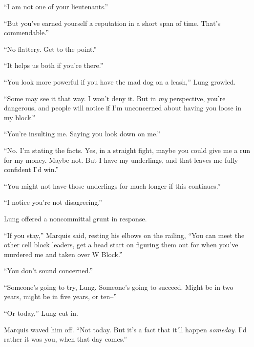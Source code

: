 ``I am not one of your lieutenants.''



``But you've earned yourself a reputation in a short span of time.  That's commendable.''



``No flattery.  Get to the point.''



``It helps us both if you're there.''



``You look more powerful if you have the mad dog on a leash,'' Lung growled.



``Some may see it that way.  I won't deny it.  But in \emph{my} perspective, you're dangerous, and people will notice if I'm unconcerned about having you loose in my block.''



``You're insulting me.  Saying you look down on me.''



``No.  I'm stating the facts.  Yes, in a straight fight, maybe you could give me a run for my money.  Maybe not.  But I have my underlings, and that leaves me fully confident I'd win.''



``You might not have those underlings for much longer if this continues.''



``I notice you're not disagreeing.''



Lung offered a noncommittal grunt in response.



``If you stay,'' Marquis said, resting his elbows on the railing, ``You can meet the other cell block leaders, get a head start on figuring them out for when you've murdered me and taken over W Block.''



``You don't sound concerned.''



``Someone's going to try, Lung.  Someone's going to succeed.  Might be in two years, might be in five years, or ten--''



``Or today,'' Lung cut in.



Marquis waved him off.  ``Not today.  But it's a fact that it'll happen \emph{someday}.  I'd rather it was you, when that day comes.''



